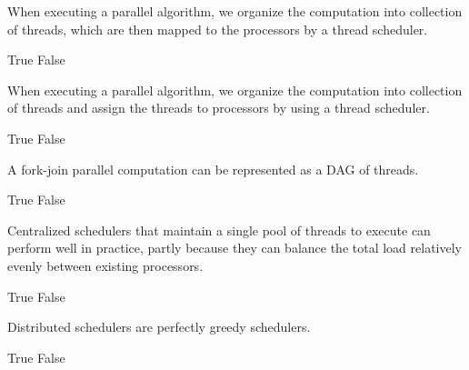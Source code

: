 \begin{cluster}
\begin{parts}
\begin{problem}[2]
When executing a parallel algorithm, we organize the computation into
collection of threads, which are then mapped to the processors by a
thread scheduler.

\begin{pickone}
\correctchoice True
\choice False
\end{pickone}
\end{problem}

\begin{problem}

When executing a parallel algorithm, we organize the computation into
collection of threads and assign the threads to processors by using a
thread scheduler.

\begin{pickone}
\correctchoice True
\choice False
\end{pickone}
\end{problem}

\begin{problem}[2]

A fork-join parallel computation can be represented as a DAG of
threads.

\begin{pickone}
\correctchoice True
\choice False
\end{pickone}
\end{problem}


\begin{problem}[2]

Centralized schedulers that maintain a single pool of threads to
execute can perform well in practice, partly because they can balance
the total load relatively evenly between existing processors.

\begin{pickone}
\choice True
\correctchoice False
\end{pickone}
\end{problem}

\begin{problem}[2]

Distributed schedulers are perfectly greedy schedulers.

\begin{pickone}
\choice True
\correctchoice False
\end{pickone}
\end{problem}

\begin{problem}


\end{problem}
\end{parts}
\end{cluster}

